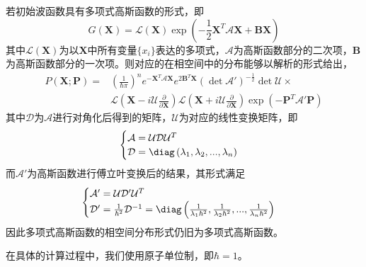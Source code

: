 若初始波函数具有多项式高斯函数的形式，即
\begin{equation}
	G(\boldsymbol{X}) = \mathcal{L}(\boldsymbol{X}) \exp{ \left( - \frac{1}{2} \boldsymbol{X}^T \mathcal{A} \boldsymbol{X} + \boldsymbol{B} \boldsymbol{X}\right)   }	
\end{equation}
其中$\mathcal{L}(\boldsymbol{X})$为以$\boldsymbol{X}$中所有变量$\{x_i\}$表达的多项式，$\mathcal{A}$为高斯函数部分的二次项，$\boldsymbol{B}$为高斯函数部分的一次项。则对应的在相空间中的分布能够以解析的形式给出，
\begin{equation}
	\begin{aligned}
		P(\boldsymbol{X};\boldsymbol{P}) =& \left( \frac{1}{\hbar \pi} \right) ^n e^{-\boldsymbol{X}^T \mathcal{A} \boldsymbol{X}} e^{2\boldsymbol{B}^T\boldsymbol{X}} \left(\det \mathcal{A'}\right)^{-\frac{1}{2}} \det \mathcal{U}\times \\
	&\mathcal{L}\left(\boldsymbol{X} - i\mathcal{U} \frac{\partial }{\partial \boldsymbol{X}} \right)\mathcal{L}\left(\boldsymbol{X} + i \mathcal{U} \frac{\partial }{\partial \boldsymbol{X}} \right)\exp \left( - \boldsymbol{P}^T \mathcal{A}'\boldsymbol{P} \right)  
\end{aligned}
\end{equation} 
其中$\mathcal{D}$为$\mathcal{A}$进行对角化后得到的矩阵，$\mathcal{U}$为对应的线性变换矩阵，即
 \begin{equation}
	 \begin{cases}
	 \mathcal{A} = \mathcal{U} \mathcal{D} \mathcal{U}^T\\
	 \mathcal{D} = \diag\left( \lambda_1, \lambda_2, ..., \lambda_n \right) 
         \end{cases}
\end{equation}
而$\mathcal{A}'$为高斯函数进行傅立叶变换后的结果，其形式满足
 \begin{equation}
\begin{cases}
	\mathcal{A'} = \mathcal{U} \mathcal{D}' \mathcal{U}^T \\
	\mathcal{D'} = \frac{1}{\hbar^2}\mathcal{D}^{-1} = \diag \left( \frac{1}{\lambda_1 \hbar^2}, \frac{1}{\lambda_2 \hbar^2}, ..., \frac{1}{\lambda_n \hbar ^2} \right) 
\end{cases}
\end{equation} 
因此多项式高斯函数的相空间分布形式仍旧为多项式高斯函数。

在具体的计算过程中，我们使用原子单位制，即$\hbar = 1$。

